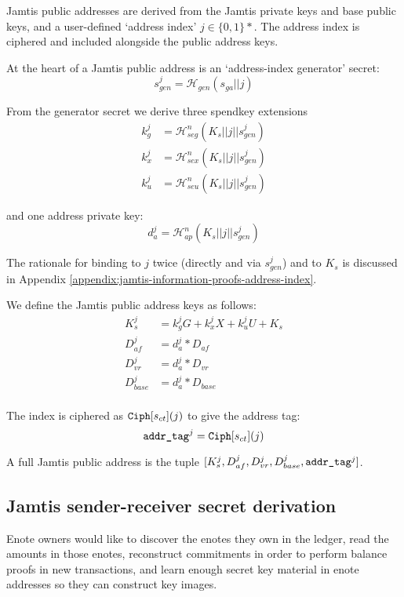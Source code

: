Jamtis public addresses are derived from the Jamtis private keys and base public keys, and a user-defined `address index' $j \in \{0,1\}*$. The address index is ciphered and included alongside the public address keys.

At the heart of a Jamtis public address is an `address-index generator' secret:\vspace{.115cm}
\[ s^j_{gen} = \mathcal{H}_{gen}(s_{ga} || j) \]

From the generator secret we derive three spendkey extensions\vspace{.115cm}
\begin{align*}
    k^j_g &= \mathcal{H}^n_{seg}(K_s || j || s^j_{gen}) \\
    k^j_x &= \mathcal{H}^n_{sex}(K_s || j || s^j_{gen}) \\
    k^j_u &= \mathcal{H}^n_{seu}(K_s || j || s^j_{gen})
\end{align*}

and one address private key:
\[ d^j_a = \mathcal{H}^n_{ap}(K_s || j || s^j_{gen}) \]

The rationale for binding to $j$ twice (directly and via $s^j_{gen}$) and to $K_s$ is discussed in Appendix \ref{appendix:jamtis-information-proofs-address-index}.

We define the Jamtis public address keys as follows:\vspace{.115cm}
\begin{align*}
    K^j_s &= k^j_g G + k^j_x X + k^j_u U + K_s \\
    D^j_{af}   &= d^j_a * D_{af} \\
    D^j_{vr}   &= d^j_a * D_{vr} \\
    D^j_{base} &= d^j_a * D_{base} \\
\end{align*}

The index is ciphered as ${\tt Ciph}[s_{ct}](j)$ to give the address tag:
\[ \textrm{\tt addr\_tag}^j = {\tt Ciph}[s_{ct}](j) \]

A full Jamtis public address is the tuple $[K^j_s, D^j_{af}, D^j_{vr}, D^j_{base}, \textrm{\tt addr\_tag}^j]$.


\subsection{Jamtis sender-receiver secret derivation}
\label{subsec:jamtis-sender-receiver-secret-derivation}

Enote owners would like to discover the enotes they own in the ledger, read the amounts in those enotes, reconstruct commitments in order to perform balance proofs in new transactions, and learn enough secret key material in enote addresses so they can construct key images.

